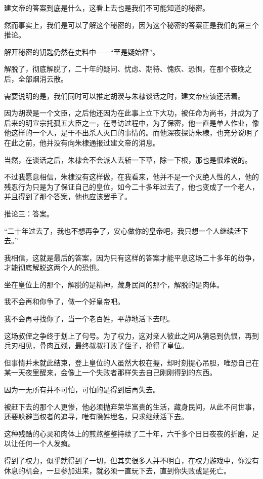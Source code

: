 \begin{multicols}{\theparacolNo}
建文帝的答案到底是什么，这看上去也是我们不可能知道的秘密。

然而事实上，我们是可以了解这个秘密的，因为这个秘密的答案正是我们的第三个推论。

解开秘密的钥匙仍然在史料中——“至是疑始释”。

解脱了，彻底解脱了，二十年的疑问、忧虑、期待、愧疚、恐惧，在那个夜晚之后，全部烟消云散。

需要说明的是，我们同时可以推定胡濙与朱棣谈话之时，建文帝应该还活着。

因为胡濙是一个文臣，之后他还因为在此事上立下大功，被任命为尚书，并成为了后来的明宣宗托孤五大臣之一，在寻访过程中，为了保密，他一直是单人作业，像他这样的一个人，是干不出杀人灭口的事情的。而他深夜探访朱棣，也充分说明了在此之前，他并没有向朱棣通报过建文帝的消息。

当然，在谈话之后，朱棣会不会派人去斩一下草，除一下根，那也是很难说的。

不过我愿意相信，朱棣没有这样做，在我看来，他并不是一个灭绝人性的人，他的残忍行为只是为了保证自己的皇位，如今二十多年过去了，他也变成了一个老人，并且得到了那个答案，他也应该罢手了。

推论三：答案。

“二十年过去了，我也不想再争了，安心做你的皇帝吧，我只想一个人继续活下去。”

我相信，这就是最后的答案，因为只有这样的答案才能平息这场二十多年的纷争，才能彻底解脱这两个人的恐惧。

坐在皇位上的那个，解脱的是精神，藏身民间的那个，解脱的是肉体。

我不会再和你争了，做一个好皇帝吧。

我不会再寻找你了，当一个老百姓，平静地活下去吧。

这场叔侄之争终于划上了句号。为了权力，这对亲人彼此之间从猜忌到仇恨，再到兵刃相见，骨肉互残，最终叔叔打败了侄子，抢得了皇位。

但事情并未就此结束，登上皇位的人虽然大权在握，却时刻提心吊胆，唯恐自己在某一天夜里醒来，会像上一个失败者那样失去自己刚刚得到的东西。

因为一无所有并不可怕，可怕的是得到后再失去。

被赶下去的那个人更惨，他必须抛弃荣华富贵的生活，藏身民间，从此不问世事，还要躲避当权者的追寻，唯有隐姓埋名，只求继续活下去。

这种残酷的心灵和肉体上的煎熬整整持续了二十年，六千多个日日夜夜的折磨，足以让任何一个人发疯。

得到了权力，似乎就得到了一切，但其实很多人并不明白，在权力游戏中，你没有休息的机会，一旦参加进来，就必须一直玩下去，直到你失败或是死亡。


\end{multicols}
